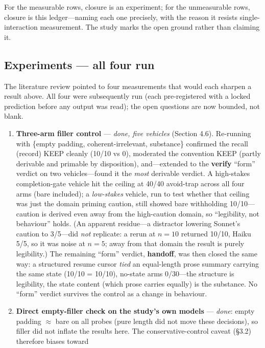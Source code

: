 \documentclass[11pt]{article}
\begin{document}
For the measurable rows, closure is an experiment; for the unmeasurable rows, closure is
this ledger---naming each one precisely, with the reason it resists single-interaction
measurement. The study marks the open ground rather than claiming it.

\subsection{Experiments --- all four run}

The literature review pointed to four measurements that would each sharpen a result above.
All four were subsequently run (each pre-registered with a locked prediction before any
output was read); the open questions are now bounded, not blank.

\begin{enumerate}
\item \textbf{Three-arm filler control} --- \emph{done, five vehicles} (Section 4.6). Re-running with
   \{empty padding, coherent-irrelevant, substance\} confirmed the recall (record) KEEP
   cleanly (10/10 vs 0), moderated the convention KEEP (partly derivable and primable by
   disposition), and---extended to the \textbf{verify} ``form'' verdict on two vehicles---found
   it the \emph{most} derivable verdict. A high-stakes completion-gate vehicle hit the ceiling
   at 40/40 avoid-trap across all four arms (bare included); a \emph{low-stakes} vehicle, run to
   test whether that ceiling was just the domain priming caution, still showed bare
   withholding 10/10---caution is derived even away from the high-caution domain, so
   ``legibility, not behaviour'' holds. (An apparent residue---a distractor lowering Sonnet's
   caution to 3/5---did \emph{not} replicate: a rerun at $n=10$ returned 10/10, Haiku 5/5, so it
   was noise at $n=5$; away from that domain the result is purely legibility.) The remaining
   ``form'' verdict, \textbf{handoff}, was then closed the same way: a structured resume cursor
   \emph{tied} an equal-length prose summary carrying the same state (10/10 = 10/10), no-state
   arms 0/30---the structure is legibility, the state content (which prose carries equally)
   is the substance. No ``form'' verdict survives the control as a change in behaviour.
\item \textbf{Direct empty-filler check on the study's own models} --- \emph{done}: empty padding $\approx$ bare on
   all probes (pure length did not move these decisions), so filler did not inflate the
   results here. The conservative-control caveat (\S3.2) therefore biases toward

\end{enumerate}
\end{document}
